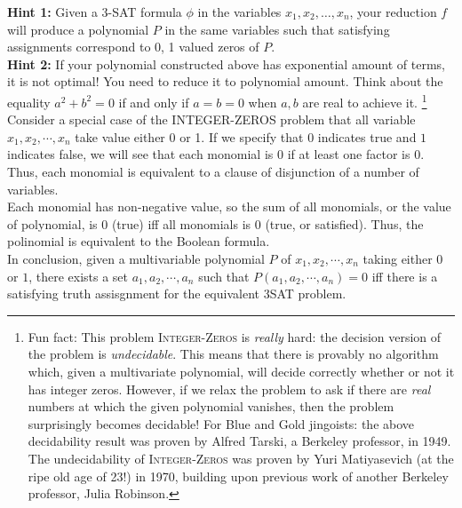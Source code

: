 \documentclass{article}\usepackage[utf8]{inputenc}\usepackage[margin=0.4cm,top=0.4cm,bottom=0.4cm]{geometry}\usepackage[usenames,dvipsnames,svgnames,table]{xcolor}
\begin{document}
\noindent \textbf{Hint 1:} Given a 3-SAT formula $\phi$ in the variables $x_1,x_2,\ldots,x_n$, your reduction $f$ will produce a polynomial $P$ in the same variables such that satisfying assignments correspond to 0, 1 valued zeros of $P$.\\
\textbf{Hint 2:} If your polynomial constructed above has exponential amount of terms, it is not optimal! You need to reduce it to polynomial amount. Think about the equality $a^2+b^2=0$ if and only if $a=b=0$ when $a,b$ are real to achieve it. \footnote{Fun fact: This problem \textsc{Integer-Zeros} is \textit{really} hard: the decision version of the problem is \textit{undecidable}. This means that there is provably no algorithm which, given a multivariate polynomial, will decide correctly whether or not it has integer zeros. However, if we relax the problem to ask if there are \textit{real} numbers at which the given polynomial vanishes, then the problem surprisingly becomes decidable! For Blue and Gold jingoists: the above decidability result was proven by Alfred Tarski, a Berkeley professor, in 1949. The undecidability of \textsc{Integer-Zeros} was proven by Yuri Matiyasevich (at the ripe old age of 23!) in 1970, building upon previous work of another Berkeley professor, Julia Robinson.}
\BeginSolution %
\\
Consider a special case of the INTEGER-ZEROS problem that all variable $x_1,x_2,\cdots,x_n$ take value either 0 or 1. If we specify that $0$ indicates true and $1$ indicates false, we will see that each monomial is $0$ if at least one factor is $0$. Thus, each monomial is equivalent to a clause of disjunction of a number of variables.\\
Each monomial has non-negative value, so the sum of all monomials, or the value of polynomial, is $0$ (true) iff all monomials is $0$ (true, or satisfied). Thus, the polinomial is equivalent to the Boolean formula.\\
In conclusion, given a multivariable polynomial $P$ of $x_1,x_2,\cdots,x_n$ taking either $0$ or $1$, there exists a set $a_1,a_2,\cdots,a_n$ such that $P(a_1,a_2,\cdots,a_n) = 0$ iff there is a satisfying truth assisgnment for the equivalent 3SAT problem.
\EndSolution
\clearpage
\end{document}
